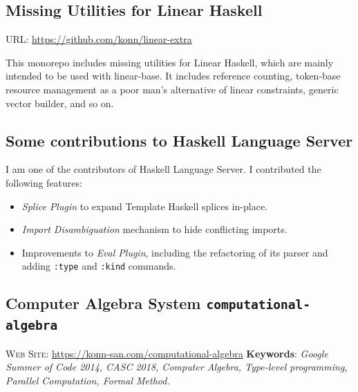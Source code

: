 \documentclass{moderncv}
\begin{document}
\subsection{Missing Utilities for Linear Haskell}

URL: \url{https://github.com/konn/linear-extra}

This monorepo includes missing utilities for Linear Haskell, which are mainly intended to be used with linear-base.
It includes reference counting, token-base resource management as a poor man's alternative of linear constraints, generic vector builder, and so on.

\subsection{Some contributions to Haskell Language Server}

I am one of the contributors of Haskell Language Server.
I contributed the following features:

\begin{itemize}
  \item \emph{Splice Plugin} to expand Template Haskell splices in-place.
  \item \emph{Import Disambiguation} mechanism to hide conflicting imports.
  \item Improvements to \emph{Eval Plugin}, including the refactoring of its parser and adding \texttt{:type} and \texttt{:kind} commands.
\end{itemize}

\subsection{Computer Algebra System \texttt{computational-algebra}}
 \vspace{-.5em}\noindent
 \textsc{Web Site}: \url{https://konn-san.com/computational-algebra}\newline
 \textbf{Keywords}: \emph{Google Summer of Code 2014, CASC 2018, Computer Algebra, Type-level programming, Parallel Computation, Formal Method.}
\end{document}
